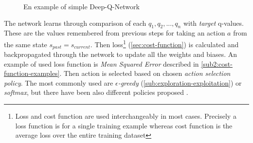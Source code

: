 \vspace{1cm}

\begin{figure}[h]
\centering
{}
\caption{En example of simple Deep-Q-Network}
\label{fig:deep-q-network}
\end{figure}

The network learns through comparison of each $q_1, q_2, ..., q_n$ with \emph{target} q-values. These are the values remembered from previous steps for taking an action $a$ from the same state $s_{past} = s_{current}$. Then loss\footnote{Loss and cost function are used interchangeably in most cases. Precisely a loss function is for a single training example whereas cost function is the average loss over the entire training dataset} (\ref{sec:cost-function}) is calculated and backpropagated through the network to update all the weights and biases. An example of used loss function is \emph{Mean Squared Error} described in \ref{sub2:cost-function-examples}. Then action is selected based on chosen \emph{action selection policy}. The most commonly used are \emph{$\epsilon$-greedy} (\ref{sub:exploration-exploitation}) or \emph{softmax}, but there have been also different policies proposed \cite{AdaptiveEGreedy}.

